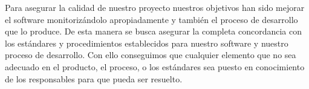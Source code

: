 Para asegurar la calidad de nuestro proyecto nuestros objetivos han sido mejorar el software monitorizándolo apropiadamente y también el proceso de desarrollo que lo produce. 
De esta manera se busca asegurar la completa concordancia con los estándares y procedimientos establecidos para nuestro software y nuestro proceso de desarrollo.
Con ello conseguimos que cualquier elemento que no sea adecuado en el producto, el proceso, o los estándares sea puesto en conocimiento de los responsables para que pueda ser resuelto.

